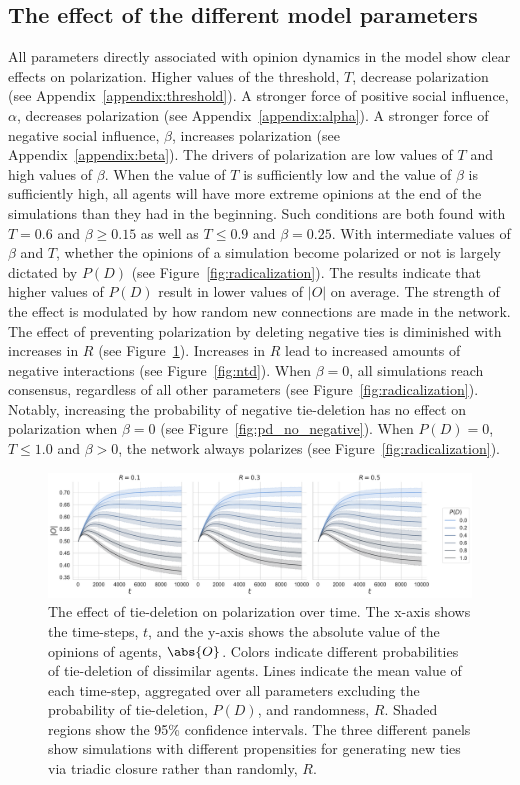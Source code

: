 \documentclass[11pt]{article}
\DeclarePairedDelimiter{\abs}\lvert\rvert
\begin{document}
\subsection{The effect of the different model parameters}
All parameters directly associated with opinion dynamics in the model show clear effects on polarization. Higher values of the threshold, $T$, decrease polarization (see Appendix~\ref{appendix:threshold}). A stronger force of positive social influence, $\alpha$, decreases polarization (see Appendix~\ref{appendix:alpha}). A stronger force of negative social influence, $\beta$, increases polarization (see Appendix~\ref{appendix:beta}).
The drivers of polarization are low values of $T$ and high values of $\beta$. When the value of $T$ is sufficiently low and the value of $\beta$ is sufficiently high, all agents will have more extreme opinions at the end of the simulations than they had in the beginning. Such conditions are both found with $T = 0.6$ and $\beta \geq 0.15$ as well as $T \leq 0.9$ and $\beta = 0.25$. With intermediate values of $\beta$ and $T$, whether the opinions of a simulation become polarized or not is largely dictated by $P(D)$ (see Figure~\ref{fig:radicalization}). 
The results indicate that higher values of $P(D)$ result in lower values of $|O|$ on average. 
The strength of the effect is modulated by how random new connections are made in the network. 
The effect of preventing polarization by deleting negative ties is diminished with increases in $R$ (see Figure~\ref{fig:pd}). Increases in $R$ lead to increased amounts of negative interactions (see Figure~\ref{fig:ntd}). 
When $\beta = 0$, all simulations reach consensus, regardless of all other parameters (see Figure~\ref{fig:radicalization}). Notably, increasing the probability of negative tie-deletion has no effect on polarization when $\beta = 0$ (see Figure~\ref{fig:pd_no_negative}). 
When $P(D) = 0$, $T \leq 1.0$ and $\beta > 0$, the network always polarizes (see Figure~\ref{fig:radicalization}).

\begin{figure}[H]
    \centering
    \includegraphics[width=.99\linewidth]{../plots/overall/Absolute_Opinion_Tie_Dissolution.pdf}
  \caption{The effect of tie-deletion on polarization over time. The x-axis shows the time-steps, $t$, and the y-axis shows the absolute value of the opinions of agents, $\abs{O}$. Colors indicate different probabilities of tie-deletion of dissimilar agents. Lines indicate the mean value of each time-step, aggregated over all parameters excluding the probability of tie-deletion, $P(D)$, and randomness, $R$. Shaded regions show the 95\% confidence intervals. The three different panels show simulations with different propensities for generating new ties via triadic closure rather than randomly, $R$.}
  \label{fig:pd}
\end{figure}
\end{document}
